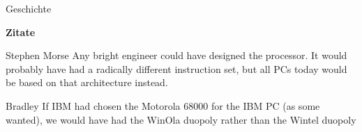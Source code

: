 \begin{frame}{Geschichte}
	\begin{center}
		\textbf{Zitate}
	\end{center}

	\begin{block}{Stephen Morse}
		Any bright engineer could have designed the processor. It would probably have had a radically different instruction set, but all PCs today would be based on that architecture instead.
	\end{block}

	\pause

	\begin{block}{Bradley}
		If IBM had chosen the Motorola 68000 for the IBM PC (as some wanted), we would have had the WinOla duopoly rather than the Wintel duopoly
	\end{block}
\end{frame}
